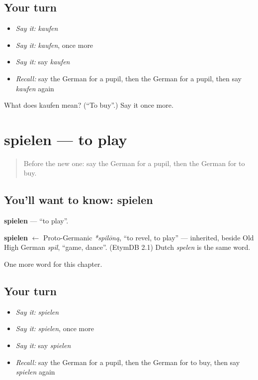 \subsection*{Your turn}
\begin{itemize}
\raggedright
  \item \emph{Say it:} \emph{kaufen}
  \item \emph{Say it:} \emph{kaufen}, once more
  \item \emph{Say it:} say \emph{kaufen}
  \item \emph{Recall:} say the German for a pupil, then the German for a pupil, then say \emph{kaufen} again
\end{itemize}

\begin{tcolorbox}[breakable,colback=teal!4,colframe=teal!35!black,title={Before you move on}]
What does kaufen mean? (\textquotedblleft{}To buy\textquotedblright{}.) Say it once more.
\end{tcolorbox}
\section[spielen]{spielen — to play}

\label{lesson:GE-C64-spielen}



\begin{quote}
Before the new one: say the German for a pupil, then the German for to buy.
\end{quote}

\subsection*{You'll want to know: spielen}
\textbf{spielen} — \textquotedblleft{}to play\textquotedblright{}.

\begin{cousinweb}
\textbf{spielen} $\leftarrow$ Proto-Germanic \emph{*spilōną}, \textquotedblleft{}to revel, to play\textquotedblright{} — inherited, beside Old High German \emph{spil}, \textquotedblleft{}game, dance\textquotedblright{}. (EtymDB 2.1) Dutch \emph{spelen} is the same word.
\end{cousinweb}

\begin{grammarlens}[title={What you've built}]
One more word for this chapter.
\end{grammarlens}

\subsection*{Your turn}
\begin{itemize}
\raggedright
  \item \emph{Say it:} \emph{spielen}
  \item \emph{Say it:} \emph{spielen}, once more
  \item \emph{Say it:} say \emph{spielen}
  \item \emph{Recall:} say the German for a pupil, then the German for to buy, then say \emph{spielen} again
\end{itemize}

